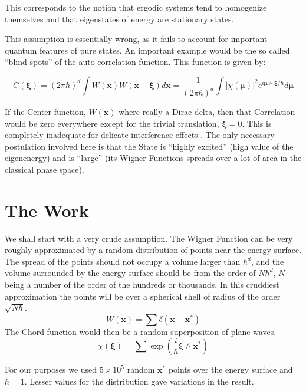 \documentclass[a4paper,10pt]{article}
\newcommand{\ihb}{\frac{i}{\hbar}}
\newcommand{\xfase}{\mathbf{x}}
\newcommand{\xifase}{ {\boldsymbol{\xi}} }
\newcommand{\mufase}{ {\boldsymbol{\mu}} }
\begin{document}
This corresponds to the notion that ergodic systems tend to 
homogenize themselves and that eigenstates of energy are
stationary states.

This assumption is essentially wrong, as it fails to account
for important quantum features of pure states. An important example would
be the so called ``blind spots'' \cite{Zambrano09} 
of the auto-correlation function.  This function is given by:

\begin{equation}
C(\xifase)=(2\pi\hbar)^d \int W(\xfase)W(\xfase-\xifase) d\xfase
=\frac{1}{(2\pi\hbar)^d}\int |\chi(\mufase)|^2 e^{i\mufase\wedge\xifase/\hbar}
d\mufase
\end{equation}

If the Center function, $W(\xfase)$ where really a Dirac delta,
then that Correlation would be zero everywhere except for 
the trivial translation,  $\xifase=0$. This is completely
inadequate for delicate interference effects \cite{Zambrano08}.
The only necessary postulation involved here is that the
State is ``highly excited'' (high value of the eigenenergy) 
and is ``large'' (its Wigner Functions spreads over a lot of area in
the classical phase space).

\section{The Work}

We shall start with a very crude assumption.
 The Wigner Function can be very roughly approximated
by a random distribution of points near the energy surface. 
The spread of the points should not occupy a volume larger than
$\hbar^d$, and the volume surrounded by the energy surface
should be from the order of $N\hbar^d$, $N$ being a number
of the order of the hundreds or thousands.  In this cruddiest
approximation the points will be over a spherical shell of
radius of the order $\sqrt{N\hbar}$. 
\begin{equation}\label{AproxCruda}
W(\xfase)=\sum \delta (\xfase - \xfase^*)
\end{equation}
The Chord function would then be a random superposition
of plane waves.
\begin{equation}
\chi(\xifase)=\sum \exp \left( \ihb \xifase\wedge\xfase^* \right)
\end{equation}

For our purposes we used $5\times 10^5$ random $\xfase^*$
points over the energy surface and $\hbar=1$. 
Lesser values for the distribution gave variations in
the result.
\end{document}
